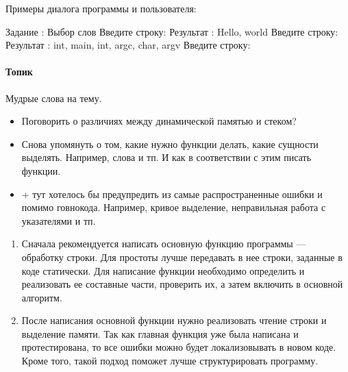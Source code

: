 Примеры диалога программы и пользователя:

\begin{zzoutput}
  Задание : Выбор слов
  Введите строку: 
  Результат     : Hello, world
  Введите строку: 
  Результат     : int, main, int, argc, char, argv
  Введите строку: \zzuser{ }
\end{zzoutput}


\zzsectionCOMMENTS


\paragraph{Топик}
Мудрые слова на тему.

\begin{itemize}
    \item Поговорить о различиях между динамической памятью и стеком?
    \item Снова упомянуть о том, какие нужно функции делать, какие сущности выделять. Например, слова и тп. И как в соответствии с этим писать функции.
    \item + тут хотелось бы предупредить из самые распространенные ошибки и помимо говнокода. Например, кривое выделение, неправильная работа с указателями и тп.
\end{itemize}


\zzsectionPLAN


\begin{enumerate}
\item Сначала рекомендуется написать основную функцию программы --- обработку строки. Для простоты лучше передавать в нее строки, заданные в коде статически. Для написание функции необходимо определить и реализовать ее составные части, проверить их, а затем включить в основной алгоритм.
\item После написания основной функции нужно реализовать чтение строки и выделение памяти. Так как главная функция уже была написана и протестирована, то все ошибки можно будет локализовывать в новом коде. Кроме того, такой подход поможет лучше структурировать программу.
\end{enumerate}


